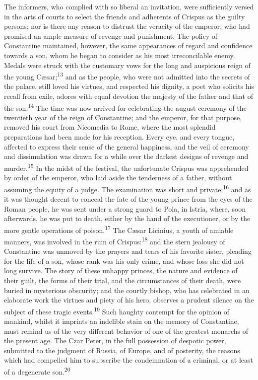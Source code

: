 
The informers, who complied with so liberal an invitation, were
sufficiently versed in the arts of courts to select the friends
and adherents of Crispus as the guilty persons; nor is there any
reason to distrust the veracity of the emperor, who had promised
an ample measure of revenge and punishment. The policy of
Constantine maintained, however, the same appearances of regard
and confidence towards a son, whom he began to consider as his
most irreconcilable enemy. Medals were struck with the customary
vows for the long and auspicious reign of the young Cæsar;\textsuperscript{13} and
as the people, who were not admitted into the secrets of the
palace, still loved his virtues, and respected his dignity, a
poet who solicits his recall from exile, adores with equal
devotion the majesty of the father and that of the son.\textsuperscript{14} The
time was now arrived for celebrating the august ceremony of the
twentieth year of the reign of Constantine; and the emperor, for
that purpose, removed his court from Nicomedia to Rome, where the
most splendid preparations had been made for his reception. Every
eye, and every tongue, affected to express their sense of the
general happiness, and the veil of ceremony and dissimulation was
drawn for a while over the darkest designs of revenge and murder.\textsuperscript{15}
In the midst of the festival, the unfortunate Crispus was
apprehended by order of the emperor, who laid aside the
tenderness of a father, without assuming the equity of a judge.
The examination was short and private;\textsuperscript{16} and as it was thought
decent to conceal the fate of the young prince from the eyes of
the Roman people, he was sent under a strong guard to Pola, in
Istria, where, soon afterwards, he was put to death, either by
the hand of the executioner, or by the more gentle operations of
poison.\textsuperscript{17} The Cæsar Licinius, a youth of amiable manners, was
involved in the ruin of Crispus:\textsuperscript{18} and the stern jealousy of
Constantine was unmoved by the prayers and tears of his favorite
sister, pleading for the life of a son, whose rank was his only
crime, and whose loss she did not long survive. The story of
these unhappy princes, the nature and evidence of their guilt,
the forms of their trial, and the circumstances of their death,
were buried in mysterious obscurity; and the courtly bishop, who
has celebrated in an elaborate work the virtues and piety of his
hero, observes a prudent silence on the subject of these tragic
events.\textsuperscript{19} Such haughty contempt for the opinion of mankind,
whilst it imprints an indelible stain on the memory of
Constantine, must remind us of the very different behavior of one
of the greatest monarchs of the present age. The Czar Peter, in
the full possession of despotic power, submitted to the judgment
of Russia, of Europe, and of posterity, the reasons which had
compelled him to subscribe the condemnation of a criminal, or at
least of a degenerate son.\textsuperscript{20}

